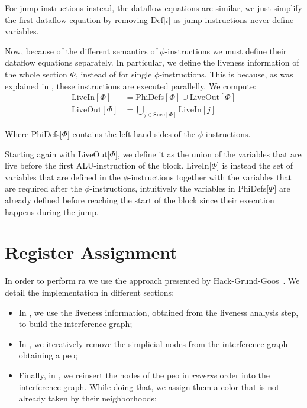 For jump instructions instead, the dataflow equations are similar, we just simplify the first dataflow equation by removing Def[$i$] as jump instructions never define variables.

Now, because of the different semantics of $\phi$-instructions we must define their dataflow equations separately. In particular, we define the liveness information of the whole section $\Phi$, instead of for single $\phi$-instructions. This is because, as was explained in , these instructions are executed parallelly.
We compute:
\begin{align*}
  \text{LiveIn}[\Phi] &= \text{PhiDefs}[\Phi] \cup \text{LiveOut}[\Phi] \\
  \text{LiveOut}[\Phi] &= \bigcup \limits_{j \in \text{Succ}[\Phi]} \text{LiveIn}[j]
\end{align*}

Where PhiDefs[$\Phi$] contains the left-hand sides of the $\phi$-instructions.

Starting again with LiveOut[$\Phi$], we define it as the union of the variables that are live before the first ALU-instruction of the block. LiveIn[$\Phi$] is instead the set of variables that are defined in the $\phi$-instructions together with the variables that are required after the $\phi$-instructions, intuitively the variables in PhiDefs[$\Phi$] are already defined before reaching the start of the block since their execution happens during the jump.

\section{Register Assignment}
\label{sec:ra}


In order to perform \gls{ra} we use the approach presented by Hack-Grund-Goos~\cite{HGG:2006:RA-SSA}. We detail the implementation in different sections:
\begin{itemize}
  \item In , we use the liveness information, obtained from the liveness analysis step, to build the interference graph;
  \item In , we iteratively remove the simplicial nodes from the interference graph obtaining a \gls{peo};
  \item Finally, in , we reinsert the nodes of the \gls{peo} in \textit{reverse} order into the interference graph. While doing that, we assign them a color that is not already taken by their neighborhoods;
\end{itemize}

